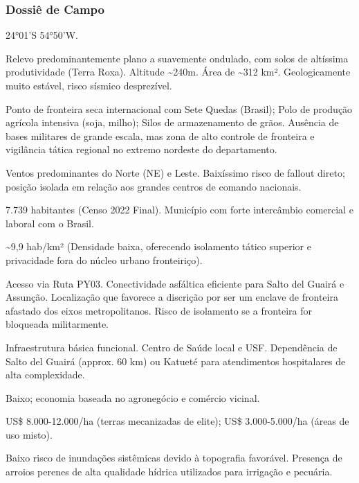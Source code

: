 \subsubsection{Dossiê de Campo}
\begin{description}[style=nextline,leftmargin=0.5cm,font=\bfseries]
\item[Coordenadas]  24°01'S 54°50'W.
\item[Topografia]  Relevo predominantemente plano a suavemente ondulado, com solos de altíssima produtividade (Terra Roxa). Altitude \textasciitilde 240m. Área de \textasciitilde 312 km². Geologicamente muito estável, risco sísmico desprezível.
\item[Alvos Estratégicos]  Ponto de fronteira seca internacional com Sete Quedas (Brasil); Polo de produção agrícola intensiva (soja, milho); Silos de armazenamento de grãos. Ausência de bases militares de grande escala, mas zona de alto controle de fronteira e vigilância tática regional no extremo nordeste do departamento.
\item[Fallout]  Ventos predominantes do Norte (NE) e Leste. Baixíssimo risco de fallout direto; posição isolada em relação aos grandes centros de comando nacionais.
\item[População]  7.739 habitantes (Censo 2022 Final). Município com forte intercâmbio comercial e laboral com o Brasil.
\item[Densidade]  \textasciitilde 9,9 hab/\allowbreak km² (Densidade baixa, oferecendo isolamento tático superior e privacidade fora do núcleo urbano fronteiriço).
\item[Vias de Acesso]  Acesso via Ruta PY03. Conectividade asfáltica eficiente para Salto del Guairá e Assunção. Localização que favorece a discrição por ser um enclave de fronteira afastado dos eixos metropolitanos. Risco de isolamento se a fronteira for bloqueada militarmente.
\item[Serviços]  Infraestrutura básica funcional. Centro de Saúde local e USF. Dependência de Salto del Guairá (approx. 60 km) ou Katueté para atendimentos hospitalares de alta complexidade.
\item[Custo de Vida]  Baixo; economia baseada no agronegócio e comércio vicinal.
\item[Preço da Terra]  US\$ 8.000-12.000/\allowbreak ha (terras mecanizadas de elite); US\$ 3.000-5.000/\allowbreak ha (áreas de uso misto).
\item[Hidrologia]  Baixo risco de inundações sistêmicas devido à topografia favorável. Presença de arroios perenes de alta qualidade hídrica utilizados para irrigação e pecuária.

\end{description}
